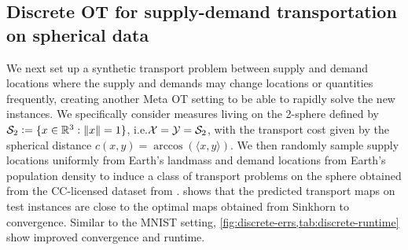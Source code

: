 \documentclass{article}
\newcommand{\ie}{i.e.\xspace}
\newcommand{\defeq}{\vcentcolon=}
\begin{document}
\subsection{Discrete OT for supply-demand transportation on spherical data}
\label{sec:exp:world}

We next set up a synthetic transport problem between supply and demand
locations where the supply and demands may change locations or quantities
frequently, creating another Meta OT setting to be able to rapidly solve
the new instances.
We specifically consider measures living on the 2-sphere defined by
$\gS_2\defeq\{x\in\R^3: \|x\|=1\}$, \ie ${\mathcal{X}}={\mathcal{Y}}={\mathcal{S}}_2$,
with the transport cost given by the spherical distance
$c(x,y)=\arccos(\langle x, y \rangle)$.
We then randomly sample supply locations uniformly from Earth's
landmass and demand locations from Earth's population density to
induce a class of transport problems on the sphere
obtained from the CC-licensed dataset from \citet{doxsey2015taking}.
 shows that the predicted transport maps
on test instances are close to the optimal maps obtained from
Sinkhorn to convergence.
Similar to the MNIST setting, \cref{fig:discrete-errs,tab:discrete-runtime}
show improved convergence and runtime.
\end{document}
